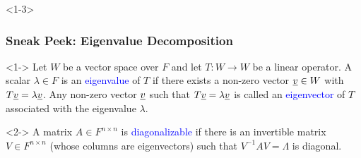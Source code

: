 \documentclass[10pt,english,aspectratio=169]{beamer}
\begin{document}
\begin{frame}<1-3> \frametitle{Sneak Peek: Eigenvalue Decomposition}

\begin{definition}<1->
Let $W$ be a vector space over $F$ and let $T\colon W \to W$ be a linear operator.
A scalar $\lambda \in F$ is an \textcolor{blue}{eigenvalue} of $T$ if there exists a non-zero vector $\underline{v} \in W$ with $T \underline{v} = \lambda \underline{v}$.
Any non-zero vector $\underline{v}$ such that $T \underline{v} = \lambda \underline{v}$ is called an \textcolor{blue}{eigenvector} of $T$ associated with the eigenvalue $\lambda$.
\end{definition}

\begin{definition}<2->
A matrix $A \in F^{n \times n}$ is \textcolor{blue}{diagonalizable} if there is an invertible matrix $V \in F^{n \times n}$ (whose columns are eigenvectors) such that $V^{-1} A V = \Lambda$ is diagonal.
\end{definition}



\end{frame}
\end{document}
